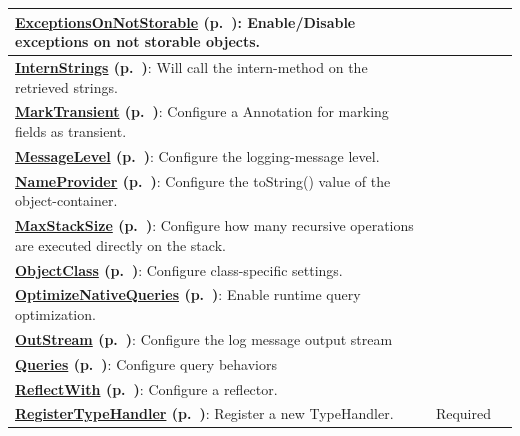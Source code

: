 {\begin{longtable}{|p{}|p{}|p{}|}
\textbf{\hyperref[ref:configuration-common-exceptionsonnotstorable]{ExceptionsOnNotStorable} (p.~\pageref{ref:configuration-common-exceptionsonnotstorable})}: Enable/Disable exceptions on not storable objects. &  &  \\ \hline
\textbf{\hyperref[ref:configuration-common-intern-strings]{InternStrings} (p.~\pageref{ref:configuration-common-intern-strings})}: Will call the intern-method on the retrieved strings. &  &  \\ \hline
\textbf{\hyperref[ref:configuration-common-mark-transient]{MarkTransient} (p.~\pageref{ref:configuration-common-mark-transient})}: Configure a Annotation for marking fields as transient. &  &  \\ \hline
\textbf{\hyperref[ref:configuration-common-message-level]{MessageLevel} (p.~\pageref{ref:configuration-common-message-level})}: Configure the logging-message level. &  &  \\ \hline
\textbf{\hyperref[ref:configuration-common-name-provider]{NameProvider} (p.~\pageref{ref:configuration-common-name-provider})}: Configure the toString() value of the object-container. &  &  \\ \hline
\textbf{\hyperref[ref:configuration-common-max-stack-size]{MaxStackSize} (p.~\pageref{ref:configuration-common-max-stack-size})}: Configure how many recursive operations are executed directly on the stack. &  &  \\ \hline
\textbf{\hyperref[ref:configuration-objectclass-configuration]{ObjectClass} (p.~\pageref{ref:configuration-objectclass-configuration})}: Configure class-specific settings. &  &  \\ \hline
\textbf{\hyperref[ref:configuration-common-disable-optimize-nq]{OptimizeNativeQueries} (p.~\pageref{ref:configuration-common-disable-optimize-nq})}: Enable runtime query optimization. &  &  \\ \hline
\textbf{\hyperref[ref:configuration-common-out-stream]{OutStream} (p.~\pageref{ref:configuration-common-out-stream})}: Configure the log message output stream &  &  \\ \hline
\textbf{\hyperref[ref:configuration-common-query-modes]{Queries} (p.~\pageref{ref:configuration-common-query-modes})}: Configure query behaviors &  &  \\ \hline
\textbf{\hyperref[ref:advanced-topics-db4o-reflection-api]{ReflectWith} (p.~\pageref{ref:advanced-topics-db4o-reflection-api})}: Configure a reflector. &  &  \\ \hline
\textbf{\hyperref[ref:advanced-topics-type-handling-typehandlers]{RegisterTypeHandler} (p.~\pageref{ref:advanced-topics-type-handling-typehandlers})}: Register a new TypeHandler. & Required &  \\ \hline

\end{longtable}}
